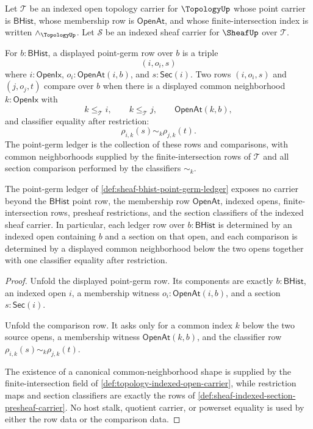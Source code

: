 \begin{definition}
\label{def:sheaf-bhist-point-germ-ledger}
Let $\mathcal{T}$ be an indexed open topology carrier for $\TopologyUp$ whose point carrier is $\mathsf{BHist}$, whose membership row is $\mathsf{OpenAt}$, and whose finite-intersection index is written $\wedge_{\TopologyUp}$. Let $\mathcal{S}$ be an indexed sheaf carrier for $\SheafUp$ over $\mathcal{T}$.

For $b:\mathsf{BHist}$, a displayed point-germ row over $b$ is a triple
$$
(i,o_i,s)
$$
where $i:\mathsf{OpenIx}$, $o_i:\mathsf{OpenAt}(i,b)$, and $s:\mathsf{Sec}(i)$. Two rows $(i,o_i,s)$ and $(j,o_j,t)$ compare over $b$ when there is a displayed common neighborhood $k:\mathsf{OpenIx}$ with
$$
k\le_{\mathcal{T}}i,
\qquad
k\le_{\mathcal{T}}j,
\qquad
\mathsf{OpenAt}(k,b),
$$
and classifier equality after restriction:
$$
\rho_{i,k}(s)\sim_k\rho_{j,k}(t).
$$
The point-germ ledger is the collection of these rows and comparisons, with common neighborhoods supplied by the finite-intersection rows of $\mathcal{T}$ and all section comparison performed by the classifiers $\sim_k$.
\end{definition}

\begin{theorem}
\label{thm:sheaf-bhist-point-germ-carrier-scope}
The point-germ ledger of \autoref{def:sheaf-bhist-point-germ-ledger} exposes no carrier beyond the $\mathsf{BHist}$ point row, the membership row $\mathsf{OpenAt}$, indexed opens, finite-intersection rows, presheaf restrictions, and the section classifiers of the indexed sheaf carrier. In particular, each ledger row over $b:\mathsf{BHist}$ is determined by an indexed open containing $b$ and a section on that open, and each comparison is determined by a displayed common neighborhood below the two opens together with one classifier equality after restriction.
\end{theorem}
\begin{proof}
Unfold the displayed point-germ row. Its components are exactly $b:\mathsf{BHist}$, an indexed open $i$, a membership witness $o_i:\mathsf{OpenAt}(i,b)$, and a section $s:\mathsf{Sec}(i)$.

Unfold the comparison row. It asks only for a common index $k$ below the two source opens, a membership witness $\mathsf{OpenAt}(k,b)$, and the classifier row $\rho_{i,k}(s)\sim_k\rho_{j,k}(t)$.

The existence of a canonical common-neighborhood shape is supplied by the finite-intersection field of \autoref{def:topology-indexed-open-carrier}, while restriction maps and section classifiers are exactly the rows of \autoref{def:sheaf-indexed-section-presheaf-carrier}. No host stalk, quotient carrier, or powerset equality is used by either the row data or the comparison data.
\end{proof}

